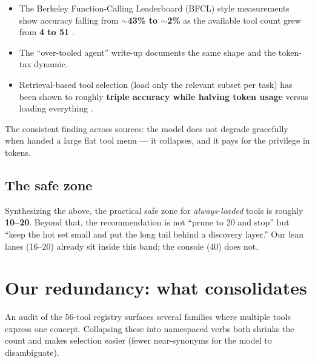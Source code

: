 \documentclass[11pt]{article}
\begin{document}
\begin{itemize}[leftmargin=*]
  \item The Berkeley Function-Calling Leaderboard (BFCL) style measurements show
  accuracy falling from $\sim$\textbf{43\% to $\sim$2\%} as the available tool
  count grew from \textbf{4 to 51} \citep{anthropic-advancedtooluse}.
  \item The ``over-tooled agent'' write-up \citep{overtooled} documents the same
  shape and the token-tax dynamic.
  \item Retrieval-based tool selection (load only the relevant subset per task)
  has been shown to roughly \textbf{triple accuracy while halving token usage}
  versus loading everything \citep{arxiv-retrieval}.
\end{itemize}

The consistent finding across sources: the model does not degrade gracefully when
handed a large flat tool menu --- it collapses, and it pays for the privilege in
tokens.

\subsection{The safe zone}

Synthesizing the above, the practical safe zone for \textit{always-loaded} tools
is roughly \textbf{10--20}. Beyond that, the recommendation is not ``prune to 20
and stop'' but ``keep the hot set small and put the long tail behind a discovery
layer.'' Our lean lanes (16--20) already sit inside this band; the console (40)
does not.

\section{Our redundancy: what consolidates}

An audit of the 56-tool registry surfaces several families where multiple tools
express one concept. Collapsing these into namespaced verbs both shrinks the
count and makes selection easier (fewer near-synonyms for the model to
disambiguate).
\end{document}
